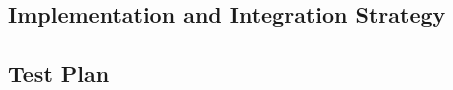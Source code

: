 \subsection{Implementation and Integration Strategy}
\label{sect:Implementation:implementation}


\subsection{Test Plan}
\label{sect:Implementation:test}
